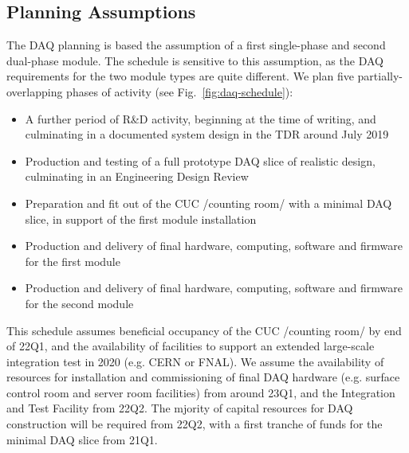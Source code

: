 \subsection{Planning Assumptions}
\label{sec:fd-daq-org-assmp}

The DAQ planning is based the assumption of a first single-phase and second dual-phase module. The schedule is sensitive to this assumption, as the DAQ requirements for the two module types are quite different. We plan five partially-overlapping phases of activity (see Fig.~\ref{fig:daq-schedule}):

\begin{itemize}
	\item A further period of R\&D activity, beginning at the time of writing, and culminating in a documented system design in the TDR around July 2019
	\item Production and testing of a full prototype DAQ slice of realistic design, culminating in an Engineering Design Review
	\item Preparation and fit out of the CUC /counting room/ with a minimal DAQ slice, in support of the first module installation
	\item Production and delivery of final hardware, computing, software and firmware for the first module
	\item Production and delivery of final hardware, computing, software and firmware for the second module
\end{itemize}

This schedule assumes beneficial occupancy of the CUC /counting room/ by end of 22Q1, and the availability of facilities to support an extended large-scale integration test in 2020 (e.g. CERN or FNAL). We assume the availability of resources for installation and commissioning of final DAQ hardware (e.g. surface control room and server room facilities) from around 23Q1, and the Integration and Test Facility from 22Q2. The mjority of capital resources for DAQ construction will be required from 22Q2, with a first tranche of funds for the minimal DAQ slice from 21Q1.



